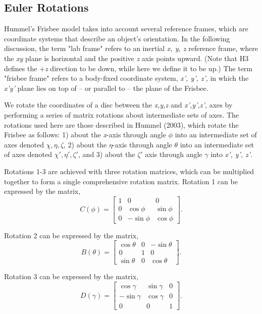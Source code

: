 \documentclass[a4paper,12pt, oneside]{article}
\begin{document}
\subsection{Euler Rotations} 

Hummel's Frisbee model takes into account several reference frames, which are coordinate systems that describe an object's orientation.  In the following discussion, the term "lab frame" refers to an inertial \textit{x, y, z} reference frame, where the \textit{xy} plane is horizontal and the positive \textit{z} axis points upward.  (Note that H3 defines the +\textit{z} direction to be down, while here we define it to be up.) The term "frisbee frame" refers to a body-fixed coordinate system, \textit{x', y', z'}, in which the \textit{x'y'} plane lies on top of -- or parallel to -- the plane of the Frisbee.

We rotate the coordinates of a disc between the \textit{x,y,z} and \textit{x',y',z',} axes by performing a series of matrix rotations about intermediate sets of axes.  The rotations used here are those described in Hummel (2003), which rotate the Frisbee as follows: 1) about the \textit{x}-axis through angle $\phi$ into an intermediate set of axes denoted $\chi,\eta,\zeta$, 2) about the $\eta$-axis through angle $\theta$ into an intermediate set of axes denoted $\chi',\eta',\zeta'$, and 3) about the $\zeta'$ axis through angle $\gamma$ into \textit{x', y', z'}.

Rotations 1-3 are achieved with three rotation matrices, which can be multiplied together to form a single comprehensive rotation matrix. Rotation 1 can be expressed by the matrix,
\begin{equation*}
C(\phi)=\begin{bmatrix}
1 & 0 & 0 \\
0 & \cos\phi & \sin\phi \\
0 & -\sin\phi & \cos\phi
\end{bmatrix}.
\end{equation*}

Rotation 2 can be expressed by the matrix, 
\begin{equation*}
B(\theta)=\begin{bmatrix}
\cos\theta & 0 & -\sin\theta \\
0 & 1 & 0 \\
\sin\theta & 0 & \cos\theta
\end{bmatrix}.
\end{equation*}

Rotation 3 can be expressed by the matrix, 
\begin{equation*}
D(\gamma)=\begin{bmatrix}
\cos\gamma & \sin\gamma & 0 \\
-\sin\gamma & \cos\gamma & 0 \\
0 & 0 & 1
\end{bmatrix}.
\end{equation*}
\end{document}

